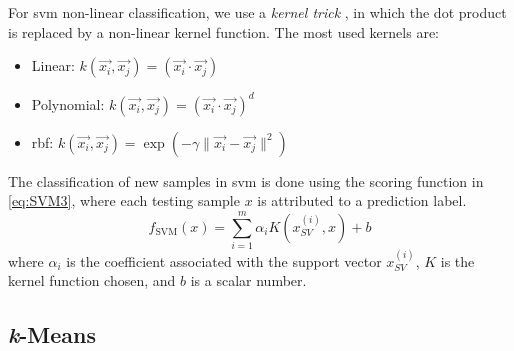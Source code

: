 For \ac{svm} non-linear classification, we use a \textit{kernel trick} \cite{scholkopf2001kernel}, in which the dot product is replaced by a non-linear kernel function. The most used kernels are:

\begin{itemize}
    
    \item Linear: ${\displaystyle k({\vec {x_{i}}},{\vec {x_{j}}})=({\vec {x_{i}}}\cdot {\vec {x_{j}}})}$

    \item Polynomial: ${\displaystyle k({\vec {x_{i}}},{\vec {x_{j}}})=({\vec {x_{i}}}\cdot {\vec {x_{j}}})^{d}}$

    \item \ac{rbf}: ${\displaystyle k({\vec {x_{i}}},{\vec {x_{j}}})=\exp(-\gamma \|{\vec {x_{i}}}-{\vec {x_{j}}}\|^{2})}$
\end{itemize}


The classification of new samples in \ac{svm} is done using the scoring function in \ref{eq:SVM3}, where each testing sample $x$ is attributed to a prediction label.
\begin{equation}
\label{eq:SVM3}
f_{\text{SVM}}(x)=\sum_{i=1}^m \alpha_i K (x_{SV}^{(i)},x)+b
\end{equation}
where $\alpha_i$ is the coefficient associated with the support vector $x_{SV}^{(i)}$, $K$ is the kernel function chosen, and $b$ is a scalar number.




\subsection{\textit{k}-Means}
\label{ssec:kMeans}

